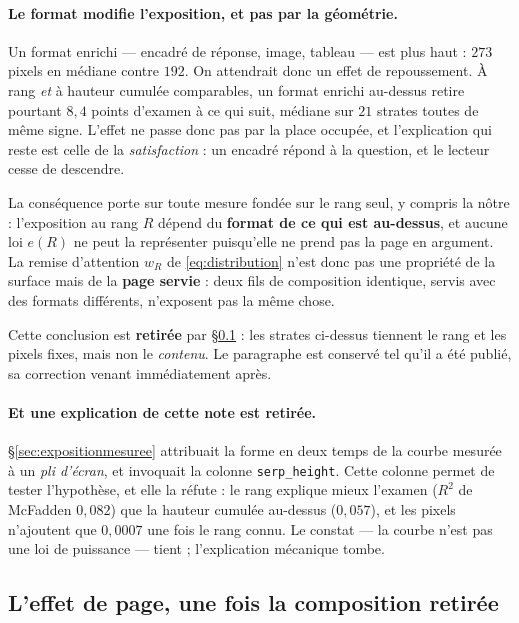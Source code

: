 \documentclass[11pt,a4paper]{article}
\begin{document}
\paragraph{Le format modifie l'exposition, et pas par la géométrie.} Un format enrichi ---
encadré de réponse, image, tableau --- est plus haut : $273$ pixels en médiane contre $192$. On
attendrait donc un effet de repoussement. À rang \emph{et} à hauteur cumulée comparables, un
format enrichi au-dessus retire pourtant $8{,}4$ points d'examen à ce qui suit, médiane sur $21$
strates toutes de même signe. L'effet ne passe donc pas par la place occupée, et l'explication qui
reste est celle de la \emph{satisfaction} : un encadré répond à la question, et le lecteur cesse de
descendre.

La conséquence porte sur toute mesure fondée sur le rang seul, y compris la nôtre : l'exposition
au rang $R$ dépend du \textbf{format de ce qui est au-dessus}, et aucune loi $e(R)$ ne peut la
représenter puisqu'elle ne prend pas la page en argument. La remise d'attention $w_R$ de
\eqref{eq:distribution} n'est donc pas une propriété de la surface mais de la \textbf{page
servie} : deux fils de composition identique, servis avec des formats différents, n'exposent pas
la même chose.

Cette conclusion est \textbf{retirée} par \S\ref{sec:effetdepage} : les strates ci-dessus tiennent
le rang et les pixels fixes, mais non le \emph{contenu}. Le paragraphe est conservé tel qu'il a été
publié, sa correction venant immédiatement après.

\paragraph{Et une explication de cette note est retirée.} \S\ref{sec:expositionmesuree} attribuait
la forme en deux temps de la courbe mesurée à un \emph{pli d'écran}, et invoquait la colonne
\texttt{serp\_height}. Cette colonne permet de tester l'hypothèse, et elle la réfute : le rang
explique mieux l'examen ($R^2$ de McFadden $0{,}082$) que la hauteur cumulée au-dessus
($0{,}057$), et les pixels n'ajoutent que $0{,}0007$ une fois le rang connu. Le constat --- la
courbe n'est pas une loi de puissance --- tient ; l'explication mécanique tombe.

\subsection{L'effet de page, une fois la composition retirée}
\label{sec:effetdepage}
\end{document}
